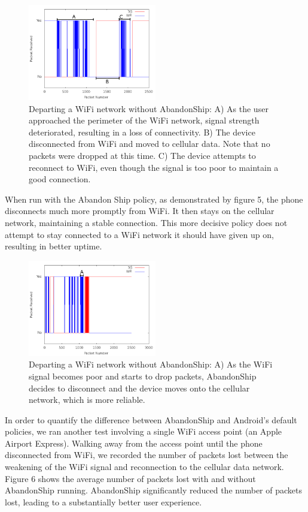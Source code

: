 \begin{figure}
	\includegraphics[width=0.5\textwidth]{leavingCourtyardsNoPolicy}
	\caption{Departing a WiFi network without AbandonShip: A) As the user approached the perimeter of the WiFi network, signal strength deteriorated, resulting in a loss of connectivity. B) The device disconnected from WiFi and moved to cellular data. Note that no packets were dropped at this time. C) The device attempts to reconnect to WiFi, even though the signal is too poor to maintain a good connection.}
\end{figure}

When run with the Abandon Ship policy, as demonstrated by figure 5, the phone disconnects much more promptly from WiFi. It then stays on the cellular network, maintaining a stable connection. This more decisive policy does not attempt to stay connected to a WiFi network it should have given up on, resulting in better uptime.

\begin{figure}
	\includegraphics[width=0.5\textwidth]{leavingCourtyardsWithPolicy}
	\caption{Departing a WiFi network without AbandonShip: A) As the WiFi signal becomes poor and starts to drop packets, AbandonShip decides to disconnect and the device moves onto the cellular network, which is more reliable.}
\end{figure}

In order to quantify the difference between AbandonShip and Android's default policies, we ran another test involving a single WiFi access point (an Apple Airport Express). Walking away from the access point until the phone disconnected from WiFi, we recorded the number of packets lost between the weakening of the WiFi signal and reconnection to the cellular data network. Figure 6 shows the average number of packets lost with and without AbandonShip running. AbandonShip significantly reduced the number of packets lost, leading to a substantially better user experience.

